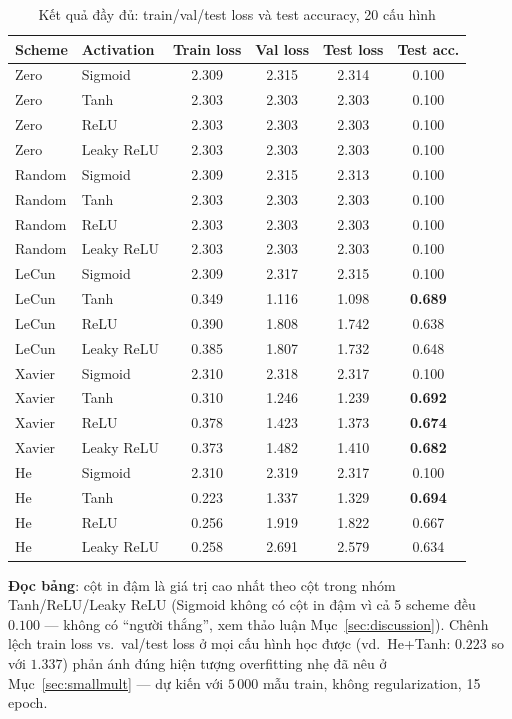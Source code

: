 \documentclass[12pt,a4paper]{article}
\begin{document}
\begin{table}[H]
\centering
\caption{Kết quả đầy đủ: train/val/test loss và test accuracy, 20 cấu hình}
\small
\begin{tabular}{@{}llcccc@{}}
\toprule
\textbf{Scheme} & \textbf{Activation} & \textbf{Train loss} & \textbf{Val loss} & \textbf{Test loss} & \textbf{Test acc.} \\
\midrule
Zero & Sigmoid & 2.309 & 2.315 & 2.314 & 0.100 \\
Zero & Tanh & 2.303 & 2.303 & 2.303 & 0.100 \\
Zero & ReLU & 2.303 & 2.303 & 2.303 & 0.100 \\
Zero & Leaky ReLU & 2.303 & 2.303 & 2.303 & 0.100 \\
\addlinespace
Random & Sigmoid & 2.309 & 2.315 & 2.313 & 0.100 \\
Random & Tanh & 2.303 & 2.303 & 2.303 & 0.100 \\
Random & ReLU & 2.303 & 2.303 & 2.303 & 0.100 \\
Random & Leaky ReLU & 2.303 & 2.303 & 2.303 & 0.100 \\
\addlinespace
LeCun & Sigmoid & 2.309 & 2.317 & 2.315 & 0.100 \\
LeCun & Tanh & 0.349 & 1.116 & 1.098 & \textbf{0.689} \\
LeCun & ReLU & 0.390 & 1.808 & 1.742 & 0.638 \\
LeCun & Leaky ReLU & 0.385 & 1.807 & 1.732 & 0.648 \\
\addlinespace
Xavier & Sigmoid & 2.310 & 2.318 & 2.317 & 0.100 \\
Xavier & Tanh & 0.310 & 1.246 & 1.239 & \textbf{0.692} \\
Xavier & ReLU & 0.378 & 1.423 & 1.373 & \textbf{0.674} \\
Xavier & Leaky ReLU & 0.373 & 1.482 & 1.410 & \textbf{0.682} \\
\addlinespace
He & Sigmoid & 2.310 & 2.319 & 2.317 & 0.100 \\
He & Tanh & 0.223 & 1.337 & 1.329 & \textbf{0.694} \\
He & ReLU & 0.256 & 1.919 & 1.822 & 0.667 \\
He & Leaky ReLU & 0.258 & 2.691 & 2.579 & 0.634 \\
\bottomrule
\end{tabular}
\label{tab:fulltable}
\end{table}

\textbf{Đọc bảng}: cột in đậm là giá trị cao nhất theo cột trong nhóm
Tanh/ReLU/Leaky ReLU (Sigmoid không có cột in đậm vì cả 5 scheme đều
$0.100$ --- không có ``người thắng'', xem thảo luận Mục~\ref{sec:discussion}).
Chênh lệch train loss vs.\ val/test loss ở mọi cấu hình học được (vd.\
He+Tanh: $0.223$ so với $1.337$) phản ánh đúng hiện tượng overfitting
nhẹ đã nêu ở Mục~\ref{sec:smallmult} --- dự kiến với $5\,000$ mẫu train,
không regularization, 15 epoch.
\end{document}
